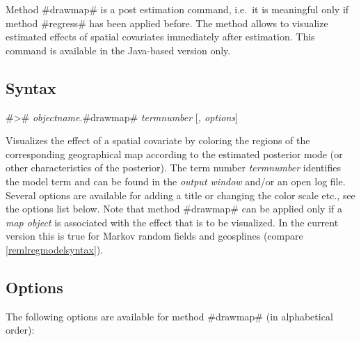 Method #drawmap# is a post estimation command, i.e.~it is
meaningful only if method #regress# has been applied before. The
method allows to visualize estimated effects of spatial covariates
immediately after estimation. This command is available in the
Java-based version only.

\subsection*{Syntax}

#># {\em objectname}.#drawmap# {\em termnumber} [{\em , options}]

Visualizes the effect of a spatial covariate by coloring the
regions of the corresponding geographical map according to the
estimated posterior mode (or other characteristics of the
posterior). The term number {\em termnumber} identifies the model
term and can be found in the {\em output window} and/or an open
log file. Several options are available for adding a title or
changing the color scale etc., see the options list below. Note
that method #drawmap# can be applied only if a {\em map object} is
associated with the effect that is to be visualized. In the
current version this is true for Markov random fields and
geosplines (compare \autoref{remlregmodelsyntax}).

\subsection*{Options}

The following options are available for method #drawmap# (in
alphabetical order):


